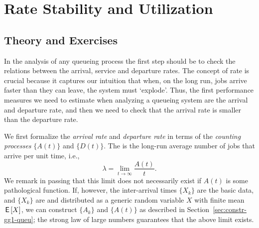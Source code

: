 \section{Rate Stability and Utilization}
\label{sec:rate-stability}

\subsection*{Theory and Exercises}


In the analysis of any queueing process the first step should be to check the relations between the arrival, service and departure rates.
The concept of rate is crucial because it captures our intuition that when, on the long run, jobs arrive faster than they can leave, the system must `explode'.
Thus, the first performance measures we need to estimate when analyzing a queueing system are the arrival and departure rate, and then we need to check that the arrival rate is smaller than the departure rate.

We first formalize the \emph{arrival rate} and \emph{departure rate} in terms of the \emph{counting processes} $\{A(t)\}$ and $\{D(t)\}$.
The  is the long-run average number of jobs that arrive per unit time, i.e.,
\begin{equation}
  \label{eq:3}
  \lambda = \lim_{t\to\infty} \frac{A(t)}t.
\end{equation}
We remark in passing that this limit does not necessarily exist if $A(t)$ is some pathological function.
If, however, the inter-arrival times $\{X_k\}$ are the basic data, and $\{X_k\}$ are 
and distributed as a generic random variable $X$ with finite mean $\,\mathsf{E}\left[X\right]$, we can construct $\{A_k\}$ and $\{A(t)\}$ as described in Section~\ref{sec:constr-gg1-queu}; the strong law of large numbers guarantees that the above limit exists.

